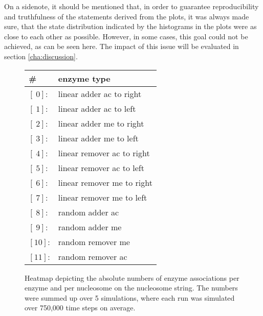         On a sidenote, it should be mentioned that, in order to guarantee reproducibility and truthfulness of the statements derived from the plots, it was always made sure, that the state distribution indicated by the histograms in the plots were as close to each other as possible. However, in some cases, this goal could not be achieved, as can be seen here. The impact of this issue will be evaluated in section \ref{cha:discussion}.\\

        \begin{figure}[htpb!]
            \centering
            \vspace{.3cm}
            \begin{center}
                \begin{tabular}{l l}
                    \hline
                    \textbf{\#} & \textbf{enzyme type} \\
                    \hline
                    $[\ 0]$: & linear adder ac to right \\
                    $[\ 1]$: & linear adder ac to left \\
                    $[\ 2]$: & linear adder me to right \\
                    $[\ 3]$: & linear adder me to left \\
                    $[\ 4]$: & linear remover ac to right \\
                    $[\ 5]$: & linear remover ac to left \\
                    $[\ 6]$: & linear remover me to right \\
                    $[\ 7]$: & linear remover me to left \\
                    $[\ 8]$: & random adder ac \\
                    $[\ 9]$: & random adder me \\
                    $[10]$: & random remover me \\
                    $[11]$: & random remover ac \\
                    \hline
                \end{tabular}
            \end{center}
            \caption{Heatmap depicting the absolute numbers of enzyme associations per enzyme and per nucleosome on the nucleosome string. The numbers were summed up over 5 simulations, where each run was simulated over 750,000 time steps on average.}
            \label{img:nonCoopAssocHeatmap}
        \end{figure}

